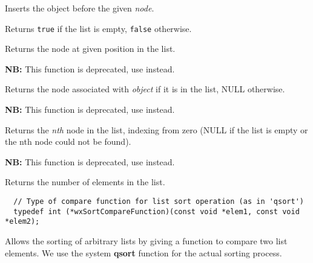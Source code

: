 
Inserts the object before the given {\it node}.

\label{wxlistisempty}


Returns {\tt true} if the list is empty, {\tt false} otherwise.

\label{wxlistitemfunc}


Returns the node at given position in the list.

\label{wxlistmember}


{\bf NB:} This function is deprecated, use  instead.

Returns the node associated with {\it object} if it is in the list, NULL otherwise.

\label{wxlistnth}


{\bf NB:} This function is deprecated, use  instead.

Returns the {\it nth} node in the list, indexing from zero (NULL if the list is empty
or the nth node could not be found).

\label{wxlistnumber}


{\bf NB:} This function is deprecated, use  instead.

Returns the number of elements in the list.

\label{wxlistsort}


\begin{verbatim}
  // Type of compare function for list sort operation (as in 'qsort')
  typedef int (*wxSortCompareFunction)(const void *elem1, const void *elem2);
\end{verbatim}

Allows the sorting of arbitrary lists by giving
a function to compare two list elements. We use the system {\bf qsort} function
for the actual sorting process.

